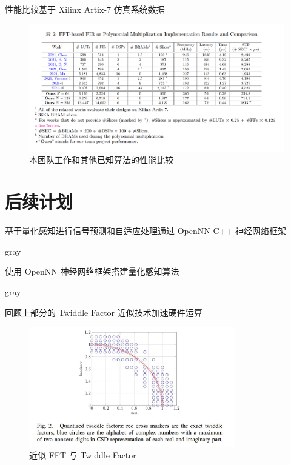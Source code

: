 \documentclass[8pt]{ctexbeamer}
\renewenvironment{quote}
{
	\begin{notebox}{gray}
}
{
	\end{notebox}
}
\begin{document}
\begin{frame}{性能比较}{基于  Xilinx Artix-7 仿真系统数据}

	\begin{center}
		\begin{figure}
			\centering
			\includegraphics[width=0.99\textwidth]{figure/Comparison.png}
			\caption{本团队工作和其他已知算法的性能比较}
			\label{fig:Comparison}
		\end{figure}
	\end{center}
\end{frame}

\section{后续计划}

\begin{frame}{基于量化感知进行信号预测和自适应处理}{通过 OpenNN C++ 神经网络框架}
	\begin{quote}
		使用 OpenNN 神经网络框架搭建量化感知算法
	\end{quote}
	\begin{quote}
		回顾上部分的 Twiddle Factor 近似技术加速硬件运算
		\begin{center}
			\begin{figure}
				\includegraphics[width=0.8\textwidth]{figure/TwiddleFactor.png}
				\caption{近似 FFT 与 Twiddle Factor}
				\label{fig:Twiddle Factor}
			\end{figure}
		\end{center}
	\end{quote}
\end{frame}
\end{document}
